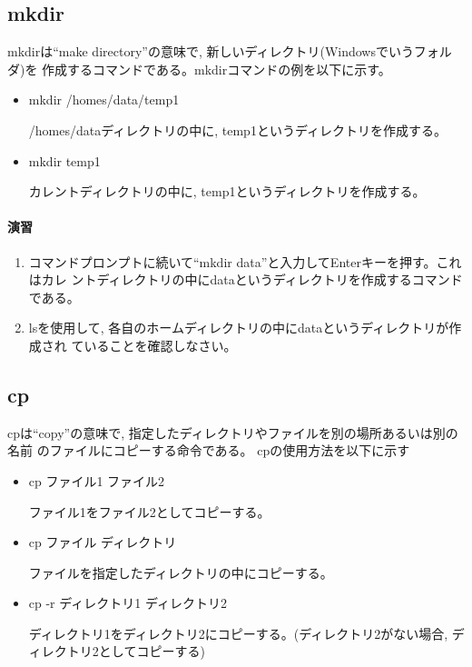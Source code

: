 \subsection{mkdir}

mkdirは``make directory''の意味で, 新しいディレクトリ(Windowsでいうフォルダ)を
作成するコマンドである。mkdirコマンドの例を以下に示す。

\begin{itemize}
\item    mkdir  /homes/data/temp1

        /homes/dataディレクトリの中に, temp1というディレクトリを作成する。

\item    mkdir  temp1

        カレントディレクトリの中に, temp1というディレクトリを作成する。
\end{itemize}

\paragraph{演習}
\begin{enumerate}
\item コマンドプロンプトに続いて``mkdir  data''と入力してEnterキーを押す。これはカレ
      ントディレクトリの中にdataというディレクトリを作成するコマンドである。
\item lsを使用して, 各自のホームディレクトリの中にdataというディレクトリが作成され
      ていることを確認しなさい。
\end{enumerate}

\subsection{cp}

cpは``copy''の意味で, 指定したディレクトリやファイルを別の場所あるいは別の名前
のファイルにコピーする命令である。
  cpの使用方法を以下に示す

\begin{itemize}
\item cp  ファイル1  ファイル2

      ファイル1をファイル2としてコピーする。

\item cp  ファイル   ディレクトリ

       ファイルを指定したディレクトリの中にコピーする。

\item cp -r ディレクトリ1  ディレクトリ2

      ディレクトリ1をディレクトリ2にコピーする。(ディレクトリ2がない場合,
      ディレクトリ2としてコピーする)
\end{itemize}

